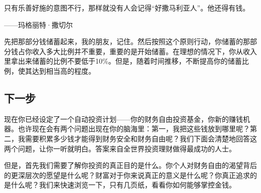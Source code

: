 \begin{BookQuote}
只有乐善好施的意图不行，那样就没有人会记得“好撒马利亚人”。他还得有钱。

\hfill ——玛格丽特·撒切尔
\end{BookQuote}

先把那部分钱储蓄起来，我的朋友，记住。然后按照这个原则行动，你储蓄的那部分钱占你收入多大比例并不重要，重要的是开始储蓄。在理想的情况下，你从收入里拿出来储蓄的比例不要低于10\%。但是，随着时间推移，不断提高你的储蓄比例，使其达到相当高的程度。

\subsection{下一步}

现在你已经设定了一个自动投资计划——你的财务自由投资基金，你新的赚钱机器。也许现在会有两个问题出现在你的脑海里：第一，我把这些钱放到哪里呢？第二，我需要积累多少钱才能得到财务安全和财务自由呢？我们下面会清楚地回答这两个问题，让你一听就明白。答案来自全世界投资理财做得最成功的人士。

但是，首先我们需要了解你投资的真正目的是什么。你个人对财务自由的渴望背后的更深层次的愿望是什么呢？财富对于你来说真正的意义是什么呢？你真正追求的是什么呢？我们来快速浏览一下，只有几页纸，看看你如何能够掌控金钱。
